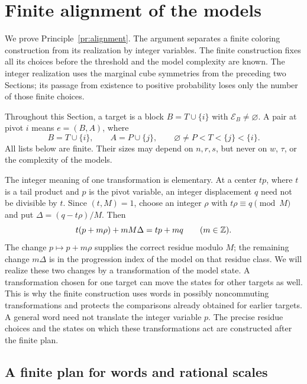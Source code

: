 \section{Finite alignment of the models}\label{sec:alignment}

We prove Principle~\ref{pr:alignment}.  The argument separates a finite
coloring construction from its realization by integer variables.  The finite
construction fixes all its choices before the threshold and the model
complexity are known.  The integer realization uses the marginal cube
symmetries from the preceding two Sections; its passage from existence to
positive probability loses only the number of those finite choices.

Throughout this Section, a target is a block $B=T\cup\{i\}$ with
$\mathcal E_B\ne\varnothing$.  A pair at pivot $i$ means
$e=(B,A)$, where
\[
 B=T\cup\{i\},\qquad A=P\cup\{j\},\qquad
 \varnothing\ne P<T<\{j\}<\{i\}.
\]
All lists below are finite.  Their sizes may depend on $n,r,s$, but never
on $w$, $\tau$, or the complexity of the models.

The integer meaning of one transformation is elementary.  At a center
$tp$, where $t$ is a tail product and $p$ is the pivot variable, an
integer displacement $q$ need not be divisible by $t$.  Since
$(t,M)=1$, choose an integer $\rho$ with $t\rho\equiv q\pmod M$ and put
$\Delta=(q-t\rho)/M$.  Then
\[
 t(p+m\rho)+mM\Delta=tp+mq\qquad(m\in\mathbb Z).
\]
The change $p\mapsto p+m\rho$ supplies the correct residue modulo $M$;
the remaining change $m\Delta$ is in the progression index of the
model on that residue class.  We will realize these two changes by
a transformation of the model state.  A transformation chosen for
one target can move the states for other targets as well.  This is
why the finite construction uses words in possibly noncommuting
transformations and protects the comparisons already obtained for
earlier targets.  A general word need not translate the integer
variable $p$.  The precise residue choices and the states on which
these transformations act are constructed after the finite plan.

\subsection{A finite plan for words and rational scales}

